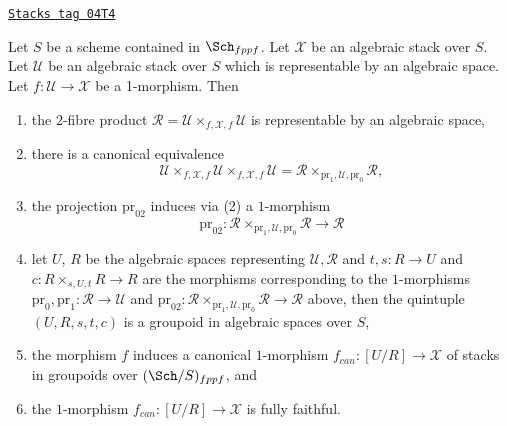 \begin{lemma}
\label{algebraic-lemma-map-space-into-stack}
\href{https://stacks.math.columbia.edu/tag/04T4}{\texttt{Stacks tag 04T4}}

Let $S$ be a scheme contained in $\Sch_{fppf}$.
Let $\mathcal{X}$ be an algebraic stack over $S$.
Let $\mathcal{U}$ be an algebraic stack over $S$ which
is representable by an algebraic space.
Let $f : \mathcal{U} \to \mathcal{X}$ be a 1-morphism. Then
\begin{enumerate}
\item the $2$-fibre product
$\mathcal{R} = \mathcal{U} \times_{f, \mathcal{X}, f} \mathcal{U}$
is representable by an algebraic space,
\item there is a canonical equivalence
$$
\mathcal{U} \times_{f, \mathcal{X}, f} \mathcal{U}
\times_{f, \mathcal{X}, f} \mathcal{U} =
\mathcal{R} \times_{\text{pr}_1, \mathcal{U}, \text{pr}_0} \mathcal{R},
$$
\item the projection $\text{pr}_{02}$ induces via (2) a $1$-morphism
$$
\text{pr}_{02} :
\mathcal{R} \times_{\text{pr}_1, \mathcal{U}, \text{pr}_0} \mathcal{R}
\longrightarrow
\mathcal{R}
$$
\item let $U$, $R$ be the algebraic spaces representing
$\mathcal{U}, \mathcal{R}$ and $t, s : R \to U$ and
$c : R \times_{s, U, t} R \to R$ are the morphisms corresponding
to the $1$-morphisms
$\text{pr}_0, \text{pr}_1 : \mathcal{R} \to \mathcal{U}$
and
$\text{pr}_{02} :
\mathcal{R} \times_{\text{pr}_1, \mathcal{U}, \text{pr}_0} \mathcal{R} \to
\mathcal{R}$ above, then the quintuple $(U, R, s, t, c)$ is a groupoid in
algebraic spaces over $S$,
\item the morphism $f$ induces a canonical $1$-morphism
$f_{can} : [U/R] \to \mathcal{X}$
of stacks in groupoids over $(\Sch/S)_{fppf}$, and
\item the $1$-morphism $f_{can} : [U/R] \to \mathcal{X}$ is fully faithful.
\end{enumerate}
\end{lemma}

